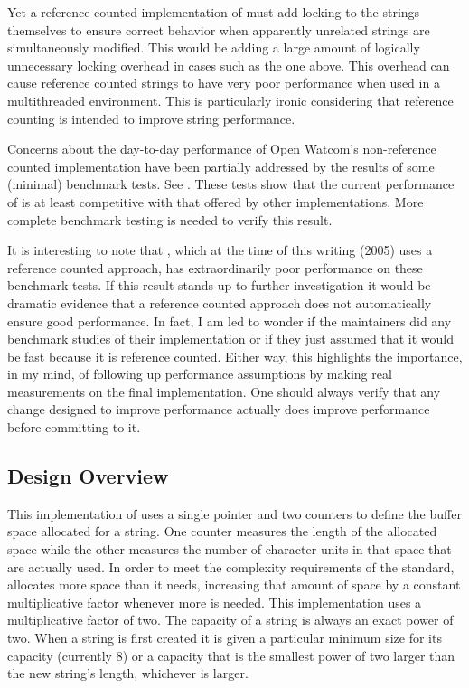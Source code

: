 Yet a reference counted implementation of  must add locking
to the strings themselves to ensure correct behavior when apparently unrelated
strings are simultaneously modified. This would be adding a large amount of
logically unnecessary locking overhead in cases such as the one above. This
overhead can cause reference counted strings to have very poor performance
when used in a multithreaded environment.  This is
particularly ironic considering that reference counting is intended to improve
string performance.


Concerns about the day-to-day performance of Open Watcom's non-reference
counted implementation have been partially addressed by the results of some
(minimal) benchmark tests. See . These tests show
that the current performance of  is at least competitive
with that offered by other implementations. More complete benchmark testing is
needed to verify this result.

It is interesting to note that , which at the time of this writing
(2005) uses a reference counted approach, has extraordinarily poor performance
on these benchmark tests. If this result stands up to further investigation it
would be dramatic evidence that a reference counted approach does not
automatically ensure good performance. In fact, I am led to wonder if the
 maintainers did any benchmark studies of their implementation or if
they just assumed that it would be fast because it is reference counted.
Either way, this highlights the importance, in my mind, of following up
performance assumptions by making real measurements on the final
implementation. One should always verify that any change designed to improve
performance actually does improve performance before committing to it.

\subsection{Design Overview}

This implementation of  uses a single pointer and two
counters to define the buffer space allocated for a string. One counter
measures the length of the allocated space while the other measures the number
of character units in that space that are actually used. In order to meet the
complexity requirements of the standard,  allocates more space
than it needs, increasing that amount of space by a constant multiplicative
factor whenever more is needed. This implementation uses a multiplicative
factor of two.  The capacity of a string is always an exact power
of two. When a string is first created it is given a particular minimum size
for its capacity (currently 8) or a capacity that is the smallest power of two
larger than the new string's length, whichever is larger.

